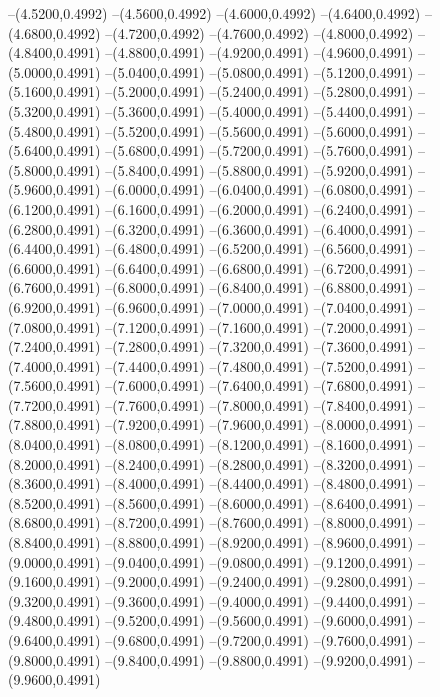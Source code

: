 {	--(4.5200,0.4992)
	--(4.5600,0.4992)
	--(4.6000,0.4992)
	--(4.6400,0.4992)
	--(4.6800,0.4992)
	--(4.7200,0.4992)
	--(4.7600,0.4992)
	--(4.8000,0.4992)
	--(4.8400,0.4991)
	--(4.8800,0.4991)
	--(4.9200,0.4991)
	--(4.9600,0.4991)
	--(5.0000,0.4991)
	--(5.0400,0.4991)
	--(5.0800,0.4991)
	--(5.1200,0.4991)
	--(5.1600,0.4991)
	--(5.2000,0.4991)
	--(5.2400,0.4991)
	--(5.2800,0.4991)
	--(5.3200,0.4991)
	--(5.3600,0.4991)
	--(5.4000,0.4991)
	--(5.4400,0.4991)
	--(5.4800,0.4991)
	--(5.5200,0.4991)
	--(5.5600,0.4991)
	--(5.6000,0.4991)
	--(5.6400,0.4991)
	--(5.6800,0.4991)
	--(5.7200,0.4991)
	--(5.7600,0.4991)
	--(5.8000,0.4991)
	--(5.8400,0.4991)
	--(5.8800,0.4991)
	--(5.9200,0.4991)
	--(5.9600,0.4991)
	--(6.0000,0.4991)
	--(6.0400,0.4991)
	--(6.0800,0.4991)
	--(6.1200,0.4991)
	--(6.1600,0.4991)
	--(6.2000,0.4991)
	--(6.2400,0.4991)
	--(6.2800,0.4991)
	--(6.3200,0.4991)
	--(6.3600,0.4991)
	--(6.4000,0.4991)
	--(6.4400,0.4991)
	--(6.4800,0.4991)
	--(6.5200,0.4991)
	--(6.5600,0.4991)
	--(6.6000,0.4991)
	--(6.6400,0.4991)
	--(6.6800,0.4991)
	--(6.7200,0.4991)
	--(6.7600,0.4991)
	--(6.8000,0.4991)
	--(6.8400,0.4991)
	--(6.8800,0.4991)
	--(6.9200,0.4991)
	--(6.9600,0.4991)
	--(7.0000,0.4991)
	--(7.0400,0.4991)
	--(7.0800,0.4991)
	--(7.1200,0.4991)
	--(7.1600,0.4991)
	--(7.2000,0.4991)
	--(7.2400,0.4991)
	--(7.2800,0.4991)
	--(7.3200,0.4991)
	--(7.3600,0.4991)
	--(7.4000,0.4991)
	--(7.4400,0.4991)
	--(7.4800,0.4991)
	--(7.5200,0.4991)
	--(7.5600,0.4991)
	--(7.6000,0.4991)
	--(7.6400,0.4991)
	--(7.6800,0.4991)
	--(7.7200,0.4991)
	--(7.7600,0.4991)
	--(7.8000,0.4991)
	--(7.8400,0.4991)
	--(7.8800,0.4991)
	--(7.9200,0.4991)
	--(7.9600,0.4991)
	--(8.0000,0.4991)
	--(8.0400,0.4991)
	--(8.0800,0.4991)
	--(8.1200,0.4991)
	--(8.1600,0.4991)
	--(8.2000,0.4991)
	--(8.2400,0.4991)
	--(8.2800,0.4991)
	--(8.3200,0.4991)
	--(8.3600,0.4991)
	--(8.4000,0.4991)
	--(8.4400,0.4991)
	--(8.4800,0.4991)
	--(8.5200,0.4991)
	--(8.5600,0.4991)
	--(8.6000,0.4991)
	--(8.6400,0.4991)
	--(8.6800,0.4991)
	--(8.7200,0.4991)
	--(8.7600,0.4991)
	--(8.8000,0.4991)
	--(8.8400,0.4991)
	--(8.8800,0.4991)
	--(8.9200,0.4991)
	--(8.9600,0.4991)
	--(9.0000,0.4991)
	--(9.0400,0.4991)
	--(9.0800,0.4991)
	--(9.1200,0.4991)
	--(9.1600,0.4991)
	--(9.2000,0.4991)
	--(9.2400,0.4991)
	--(9.2800,0.4991)
	--(9.3200,0.4991)
	--(9.3600,0.4991)
	--(9.4000,0.4991)
	--(9.4400,0.4991)
	--(9.4800,0.4991)
	--(9.5200,0.4991)
	--(9.5600,0.4991)
	--(9.6000,0.4991)
	--(9.6400,0.4991)
	--(9.6800,0.4991)
	--(9.7200,0.4991)
	--(9.7600,0.4991)
	--(9.8000,0.4991)
	--(9.8400,0.4991)
	--(9.8800,0.4991)
	--(9.9200,0.4991)
	--(9.9600,0.4991)
}
